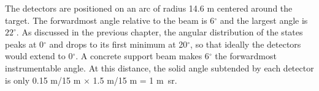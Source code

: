 The detectors are positioned on an arc of radius 14.6 m centered around the target.  The forwardmost angle relative to the beam is 6$^{\circ}$ and the largest angle is $22^{\circ}$.  As discussed in the previous chapter, the angular distribution of the \zp states peaks at 0$^{\circ}$ and drops to its first minimum at 20$^{\circ}$, so that ideally the detectors would extend to 0$^{\circ}$.  A concrete support beam makes 6$^{\circ}$ the forwardmost instrumentable angle.  At this distance, the solid angle subtended by each detector is only 0.15 m/15 m $\times$ 1.5 m/15 m = 1 m~sr.
\begin{figure}[htp]
\centering
{}\\
\subfloat[][]{
}
\end{figure}
